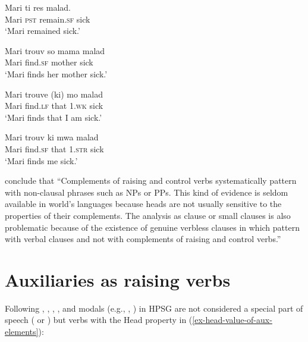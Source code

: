 \documentclass[output=paper
	        ,collection
	        ,collectionchapter
 	        ,biblatex
                ,babelshorthands
                ,newtxmath
                ,draftmode
                ,colorlinks, citecolor=brown
]{langscibook}
\begin{document}
\begin{exe}
\ex \begin{xlist}
\ex 
\gll Mari ti res  malad.\\
     Mari \textsc{pst} remain.\textsc{sf} sick\\\hfill\citep[]{HenriandLaurens2011}
\glt `Mari remained sick.'

\ex 
\gll Mari trouv  so mama malad\\
     Mari find.\textsc{sf} \POSS{} mother sick\\
\glt `Mari finds her mother sick.'

\ex 
\gll Mari trouve (ki) mo malad\\
     Mari find.\textsc{lf} that 1\SG.\textsc{wk} sick\\
\glt `Mari finds that I am sick.'

\ex 
\gll Mari trouv ki mwa malad\\
     Mari find.\textsc{sf} that 1\SG.\textsc{str} sick\\
\glt `Mari finds me sick.'
\end{xlist}
\end{exe}

\citet[]{HenriandLaurens2011} conclude that ``Complements of raising and control verbs systematically pattern with non-clausal phrases such as NPs or PPs. This kind of evidence is seldom available in world's languages because heads are not usually sensitive to the properties of their complements. The analysis as clause or small clauses is also problematic because of the existence of genuine verbless clauses in  which pattern with verbal clauses and not with complements of raising and control verbs.''




\section{Auxiliaries as raising verbs}
\label{sec-auxiliaries-as-raising-verbs}

Following \citep{Ross69a-u,Gazdaretal1982, Sagetal2020}, 
 , , , and modals (e.g., , ) in HPSG are not considered a special part of speech ( or ) but verbs with the Head property in (\ref{ex-head-value-of-aux-elements}):

\begin{exe}
\ex \label{ex-head-value-of-aux-elements}
   \impl
\avm{
	[head &	[aux & $+$] ]
}
 \end{exe}
 
\end{document}
